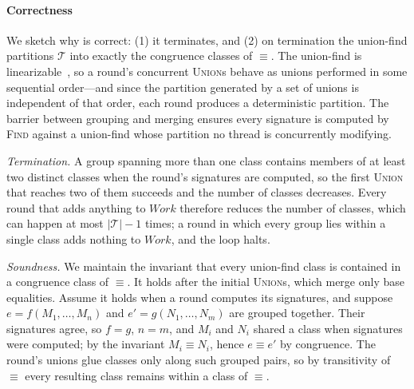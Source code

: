\paragraph{Correctness} We sketch why \parentalgo{} is correct: (1) it
terminates, and (2) on termination the union-find partitions $\mathcal{T}$ into
exactly the congruence classes of $\equiv$. The union-find is
linearizable~\cite{uf}, so a round's concurrent \textsc{Union}s behave as
unions performed in some sequential order---and since the partition generated
by a set of unions is independent of that order, each round produces a
deterministic partition. The barrier between grouping and
merging ensures every signature is computed by \textsc{Find} against a
union-find whose partition no thread is concurrently modifying.

\emph{Termination.} A group spanning more than one class contains members
of at least two distinct classes when the round's signatures are computed, so
the first \textsc{Union} that reaches two of them succeeds and the number of
classes decreases. Every round that adds anything to $\mathit{Work}$
therefore reduces the number of classes, which can happen at most
$|\mathcal{T}|-1$ times; a round in which every group lies within a single
class adds nothing to $\mathit{Work}$, and the loop halts.

\emph{Soundness.} We maintain the invariant that every union-find class is
contained in a congruence class of $\equiv$. It holds after the initial
\textsc{Union}s, which merge only base equalities. Assume it holds when a round
computes its signatures, and suppose $e = f(M_1,\ldots,M_n)$ and
$e' = g(N_1,\ldots,N_m)$ are grouped together. Their signatures agree, so
$f = g$, $n = m$, and $M_i$ and $N_i$ shared a class when signatures were
computed; by the invariant $M_i \equiv N_i$, hence $e \equiv e'$ by congruence.
The round's unions glue classes only along such grouped pairs, so by
transitivity of $\equiv$ every resulting class remains within a class of
$\equiv$.

